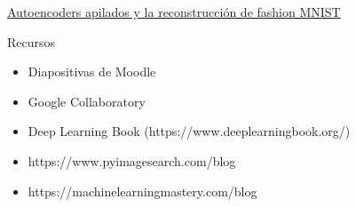 \begin{exercise}
\href{https://colab.research.google.com/drive/18_mDUr6XVRtWmUcJ7UuZgODjWblpAS2f}{Autoencoders apilados y la reconstrucción de fashion MNIST}
\end{exercise}


\begin{frame}{Recursos}
\begin{itemize}
    \item Diapositivas de Moodle
    \item Google Collaboratory
    \item Deep Learning Book (https://www.deeplearningbook.org/)
    \item https://www.pyimagesearch.com/blog
    \item https://machinelearningmastery.com/blog
\end{itemize}
\end{frame}






\appendix

